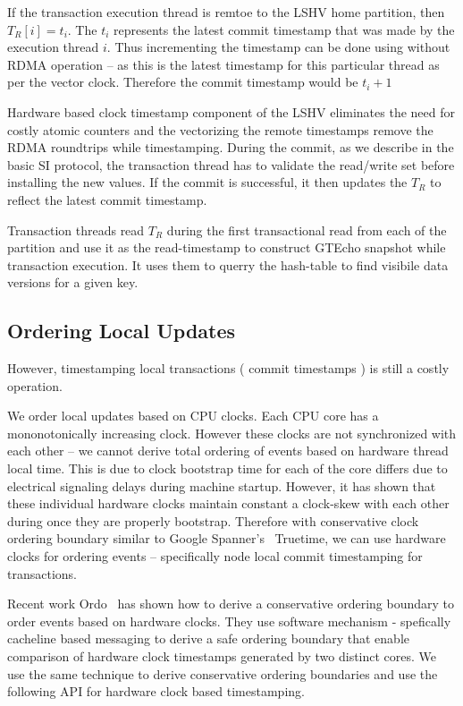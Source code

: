 If the transaction execution thread is remtoe to the LSHV home partition, then $T_R[i] = t_i $. The $t_i$
represents the latest commit timestamp that was made by the execution thread $i$. Thus incrementing the 
timestamp can be done using without RDMA operation -- as this is the latest timestamp for this particular 
thread as per the vector clock. Therefore the commit timestamp would be $t_i + 1$

Hardware based clock timestamp component of the LSHV eliminates the need for costly atomic counters and
the vectorizing the remote timestamps remove the RDMA roundtrips while timestamping. During the commit,
as we describe in the basic SI protocol, the transaction thread has to validate the read/write set before
installing the new values. If the commit is successful, it then updates the $T_R$ to reflect the latest commit
timestamp.

Transaction threads read $T_R$ during the first transactional read from each of the partition and use it
as the read-timestamp to construct GTEcho snapshot while transaction execution. It uses them to querry
the hash-table to find visibile data versions for a given key.

\subsection{Ordering Local Updates}
However, timestamping local transactions ( commit timestamps ) is still a costly operation.



We order local updates based on CPU clocks. Each CPU core has a mononotonically increasing clock. However
these clocks are not synchronized with each other -- we cannot derive total ordering of events based on hardware thread
local time. This is due to clock bootstrap time for each of the core differs due to electrical signaling delays during machine
startup. However, it has shown that these individual hardware clocks maintain constant a clock-skew with each other during
once they are properly bootstrap. Therefore with conservative clock ordering boundary similar to Google Spanner's~\cite{spanner}
Truetime, we can use hardware clocks for ordering events -- specifically node local commit timestamping for transactions.

Recent work Ordo~\cite{ordo} has shown how to derive a conservative ordering boundary to order events based on hardware clocks.
They use software mechanism - spefically cacheline based messaging to derive a safe ordering boundary that enable comparison
of hardware clock timestamps generated by two distinct cores. We use the same technique to derive conservative ordering boundaries and
use the following API for hardware clock based timestamping.


